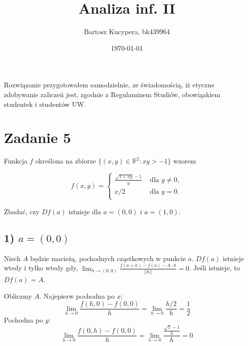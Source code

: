 \documentclass{article}
\title{Analiza inf. II}
\author{Bartosz Kucypera, bk439964}
\date{\today}
\begin{document}
\maketitle

Rozwiązanie przygotowałem samodzielnie, ze świadomością, iż etyczne zdobywanie zaliczeń jest, zgodnie z Regulaminem Studiów, obowiązkiem studentek i studentów UW.

\section*{Zadanie 5}

Funkcja $f$ określona na zbiorze $\{(x,y)\in \mathbb{R}^2:xy>-1\}$ wzorem

\[ 
f(x,y)=
\begin{cases} \displaystyle
	\frac{\sqrt{1+xy}-1}{y} & \mbox{ dla } y\neq0, \\
	x /2 & \mbox{ dla }y=0. \\
   \end{cases}
\]


Zbadać, czy $Df(a)$ istnieje dla $a=(0,0)$ i $a=(1,0)$.

\subsection*{1) $a=(0,0)$}
Niech $A$ będzie macieżą, pochodnych cząstkowych w punkcie $a$. \newline \newline 
$Df(a)$ istnieje wtedy i tylko wtedy gdy,  $\displaystyle \lim_{h \to (0,0)} \frac{f(a+h)-f(a)-A \cdot h}{||h||} = 0$. Jeśli istnieje, to $Df(a)$ = $A$. \newline

Obliczmy $A$. Najepierw pochodna po $x$:
$$ \lim_{h \to 0} \frac{f(h,0) - f(0, 0)}{h} = 
\lim_{h \to 0} \frac{h/2}{h} = \frac{1}{2}$$
Pochodna po $y$:
$$
\lim_{h \to 0} \frac{f(0, h) - f(0, 0)}{h} = 
\lim_{h \to 0} \frac{\frac{\sqrt{1}-1}{h}}{h} = 0
$$
\end{document}
